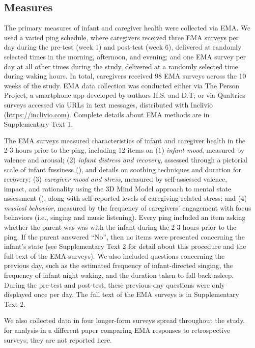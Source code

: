 \documentclass[
]{article}
\begin{document}
\subsection{Measures}\label{measures}

The primary measures of infant and caregiver health were collected via
EMA. We used a varied ping schedule, where caregivers received three EMA
surveys per day during the pre-test (week 1) and post-test (week 6),
delivered at randomly selected times in the morning, afternoon, and
evening; and one EMA survey per day at all other times during the study,
delivered at a randomly selected time during waking hours. In total,
caregivers received 98 EMA surveys across the 10 weeks of the study. EMA
data collection was conducted either via The Person Project, a
smartphone app developed by authors H.S. and D.T; or via Qualtrics
surveys accessed via URLs in text messages, distributed with Inclivio
(\url{https://inclivio.com}). Complete details about EMA methods are in
Supplementary Text 1.

The EMA surveys measured characteristics of infant and caregiver health
in the 2-3 hours prior to the ping, including 12 items on (1)
\emph{infant mood}, measured by valence and arousal; (2) \emph{infant
distress and recovery}, assessed through a pictorial scale of infant
fussiness (), and details on
soothing techniques and duration for recovery; (3) \emph{caregiver mood
and stress}, measured by self-assessed valence, impact, and rationality
using the 3D Mind Model approach to mental state assessment
(), along with
self-reported levels of caregiving-related stress; and (4) \emph{musical
behavior}, measured by the frequency of caregivers' engagement with
focus behaviors (i.e., singing and music listening). Every ping included
an item asking whether the parent was was with the infant during the 2-3
hours prior to the ping. If the parent answered ``No'', then no items
were presented concerning the infant's state (see Supplementary Text 2
for detail about this procedure and the full text of the EMA surveys).
We also included questions concerning the previous day, such as the
estimated frequency of infant-directed singing, the frequency of infant
night waking, and the duration taken to fall back asleep. During the
pre-test and post-test, these previous-day questions were only displayed
once per day. The full text of the EMA surveys is in Supplementary Text
2.

We also collected data in four longer-form surveys spread throughout the
study, for analysis in a different paper comparing EMA responses to
retrospective surveys; they are not reported here.
\end{document}
